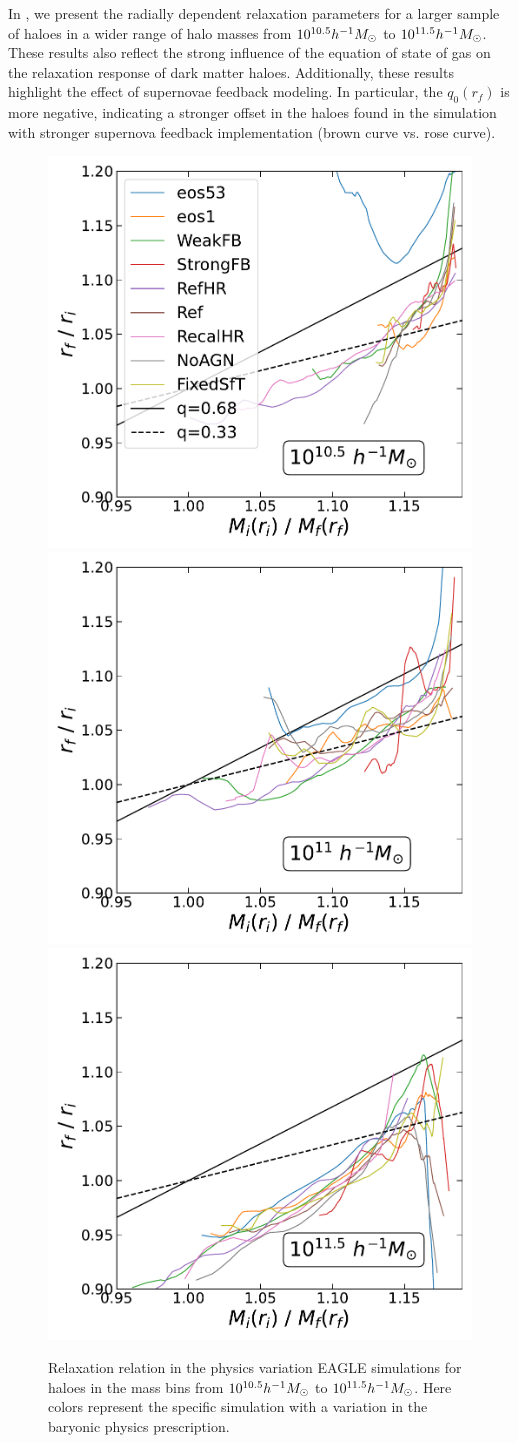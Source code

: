 In , we present the radially dependent relaxation parameters for a larger sample of haloes in a wider range of halo masses from $10^{10.5} h^{-1}M_{\odot}$ to $10^{11.5} h^{-1}M_{\odot}$. These results also reflect the strong influence of the equation of state of gas on the relaxation response of dark matter haloes. Additionally, these results highlight the effect of supernovae feedback modeling. In particular, the $q_0(r_f)$ is more negative, indicating a stronger offset in the haloes found in the simulation with stronger supernova feedback implementation (brown curve vs. rose curve).    

\begin{figure}[htbp]
\centering
\includegraphics[width=0.32\linewidth]{plots/eagle_physvar_rad_indep_relxn_reln_MiMf_10.5.pdf}
\includegraphics[width=0.32\linewidth]{plots/eagle_physvar_rad_indep_relxn_reln_MiMf_11.pdf}
\includegraphics[width=0.32\linewidth]{plots/eagle_physvar_rad_indep_relxn_reln_MiMf_11.5.pdf}
\caption{Relaxation relation in the physics variation EAGLE simulations for haloes in the mass bins from $10^{10.5} h^{-1}M_{\odot}$ to $10^{11.5} h^{-1}M_{\odot}$. Here colors represent the specific simulation with a variation in the baryonic physics prescription.}
\label{fig:EAGLE-rad-indep}
\end{figure}

